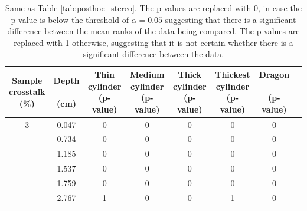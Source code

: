 \begin{table}[H]
  \begin{center}
    \caption{Same as Table \ref{tab:posthoc_stereo}. The p-values are replaced with 0, in case the p-value is below the threshold of $\alpha = 0.05$ suggesting that there is a significant difference between the mean ranks of the data being compared. The p-values are replaced with 1 otherwise, suggesting that it is not certain whether there is a significant difference between the data.}
    \label{tab:posthoc_stereo_null}
    \begin{tabular}{cccccccc}
      \toprule
      \specialcell{Sample\\crosstalk\\(\%)} & \specialcell{Depth \\ \\(cm)} & \specialcell{Thin \\cylinder \\(p-value)} & \specialcell{Medium \\cylinder \\(p-value)} & \specialcell{Thick \\cylinder \\(p-value)} & \specialcell{Thickest \\cylinder \\(p-value)} & \specialcell{Dragon \\ \\(p-value)}\\
      \midrule
           3&                   0.047&           0        &           0        &           0        &           0        &           0  \\      
            &                    0.734&           0        &           0        &           0        &           0        &           0     \\   
            &                    1.185&           0        &           0        &           0        &           0        &           0        \\
            &                     1.537&           0        &           0        &           0        &           0        &           0        \\
            &                     1.759&           0        &           0        &           0        &           0        &           0        \\
            &                   2.767&           1        &           0        &           0        &           1        &           0        \\

\end{tabular}
\end{center}
\end{table}
